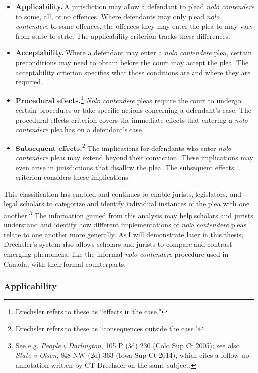 \begin{itemize}
    \item \textbf{Applicability.} A jurisdiction may allow a defendant to plead \textit{nolo contendere} to some, all, or no offences. Where defendants may only plead \textit{nolo contendere} to some offences, the offences they may enter the plea to may vary from state to state. The applicability criterion tracks these differences.
    \item \textbf{Acceptability.} Where a defendant may enter a \textit{nolo contendere} plea, certain preconditions may need to obtain before the court may accept the plea. The acceptability criterion specifies what those conditions are and where they are required.
    \item \textbf{Procedural effects.}\footnote{Drechsler refers to these as ``effects in the case."} \textit{Nolo contendere} pleas require the court to undergo certain procedures or take specific actions concerning a defendant's case. The procedural effects criterion covers the immediate effects that entering a \textit{nolo contendere} plea has on a defendant's case.
    \item \textbf{Subsequent effects.}\footnote{Drechsler refers to these as ``consequences outside the case."} The implications for defendants who enter \textit{nolo contendere} pleas may extend beyond their conviction. These implications may even arise in jurisdictions that disallow the plea. The subsequent effects criterion considers these implications.
\end{itemize}
This classification has enabled and continues to enable jurists, legislators, and legal scholars to categorize and identify individual instances of the plea with one another.\footnote{See e.g. \textit{People v Darlington}, 105 P (3d) 230 (Colo Sup Ct 2005); see also \textit{State v Olsen}, 848 NW (2d) 363 (Iowa Sup Ct 2014), which cites a follow-up annotation written by CT Drechsler on the same subject.} The information gained from this analysis may help scholars and jurists understand and identify how different implementations of \textit{nolo contendere} pleas relate to one another more generally. As I will demonstrate later in this thesis, Drechsler's system also allows scholars and jurists to compare and contrast emerging phenomena, like the informal \textit{nolo contendere} procedure used in Canada, with their formal counterparts.

\subsubsection{Applicability}

